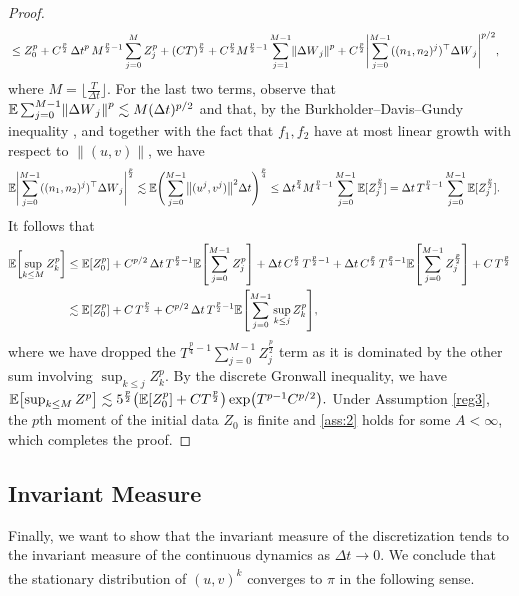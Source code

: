 \documentclass[11pt, twoside]{report}
\begin{document}
\begin{proof}
\begin{align*}
  &\leq Z_0^p + C^{\frac{p}2}  \,\deltat^p\, M^{\frac{p}{2}-1} \sum_{j=0}^M Z_j^{p} + (CT)^{\frac{p}{2}} + C^{\frac{p}{2}} M^{\frac{p}{2}-1} \sum_{j=1}^{M-1} \norm{\deltaw_j}^p + C^{\frac{p}{2}} \Biggl|\sum_{j=0}^{M-1} ((n_1,n_2)^j)^\top{\deltaw_j}\Biggr|^{p/2},
\end{align*}
where $M = \lfloor \frac{T}{\Delta t} \rfloor$. For the last two terms, observe that
  $\EE\sum_{j=0}^{M-1} \norm{\deltaw_j}^p \lesssim M (\deltat)^{p/2}$ and that, by the Burkholder--Davis--Gundy inequality \cite{10.1214/aop/1176997023}, and together with the fact that $f_1,f_2$ have at most linear growth with respect to $\|(u,v)\|$, we have \begin{align*}
   \EE \Biggl|\sum_{j=0}^{M-1} ((n_1,n_2)^j)^\top {\deltaw_j}\Biggr|^{\frac{p}2} &\lesssim \EE \Biggl(\sum_{j=0}^{M-1} \norm{(u^j,v^j)}^2 \deltat\Biggr)^{\frac{p}4}
    \leq \deltat^{\frac{p}4} M^{\frac{p}{4}-1}\sum_{j=0}^{M-1} \EE[Z_j^{\frac{p}2}]
    = \deltat\, T^{\frac{p}{4}-1} \sum_{j=0}^{M-1} \EE[Z_j^{\frac{p}2}].
    \end{align*}
It follows that
\begin{align*}
    \EE\bp{\sup_{k\leq M} Z_k^p}
&\leq \mean{Z_0^p} + C^{p/2}  \,\deltat \,T^{\frac{p}{2}-1} \mean{\sum_{j=0}^{M-1} Z_j^p} + \deltat\, C^{\frac{p}{2}}\, T^{\frac{p}{2}-1} +\deltat\, C^{ \frac{p}{2}} \,T^{\frac{p}{4}-1}\mean{\sum_{j=0}^{M-1} Z_j^{\frac{p}{2}}} + C\,T^{\frac{p}{2}}\\
&\lesssim \mean{Z_0^p} +C\,T^{\frac{p}{2}}+ C^{p/2}  \,\deltat \,T^{\frac{p}{2}-1} \mean{\sum_{j=0}^{M-1} \sup_{k\leq j} Z_k^p}, 
\end{align*}
where we have dropped the $T^{\frac{p}{4}-1}\sum_{j=0}^{M-1} Z_j^{\frac{p}{2}}$ term as it is dominated by the other sum involving $\sup_{k\leq j}Z_k^p$. By the discrete Gronwall inequality, we have
$
 \EE\bp{\sup_{k\leq M} Z^p} \lesssim  5^{\frac{p}2}  \pp{\mathbb{E}\bp{Z_0^p} + C T^{\frac{p}{2}}} \exp\bigl(T^{p-1} C^{p/2} \bigr).
$
Under Assumption \ref{reg3}, the $p$th moment of the initial data $Z_0$ is finite and \ref{ass:2} holds for some $A<\infty$, which completes the proof.
\end{proof}

\subsection{Invariant Measure}
Finally, we want to show that the invariant measure of the discretization tends to the invariant measure of the continuous dynamics as $\Delta t \xrightarrow[]{} 0$. We conclude that the stationary distribution of $(u,v)^k$ converges to $\pi$ in the following sense.
\end{document}
